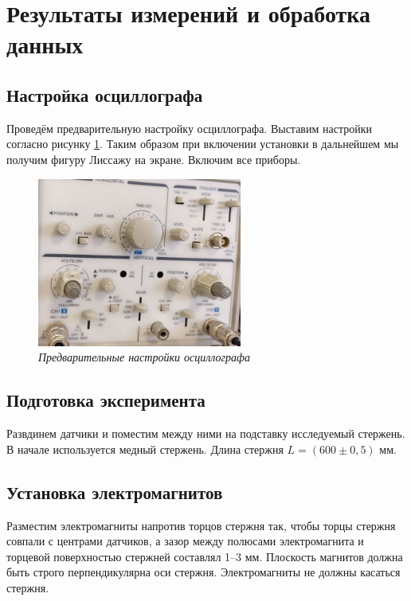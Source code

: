 \documentclass[a4paper,12pt]{article}
\begin{document}
\section{Результаты измерений и обработка данных}

\subsection{Настройка осциллографа}

Проведём предварительную настройку осциллографа. Выставим настройки согласно рисунку \ref{oscillator}. Таким образом при включении установки в дальнейшем мы получим фигуру Лиссажу на экране. Включим все приборы.

\begin{figure}[h!]
        \centering
	\includegraphics[width=0.6\textwidth]{oscillator-settings.jpg}
	\caption{\textit{Предварительные настройки осциллографа}}
	\label{oscillator}
\end{figure}

\subsection{Подготовка эксперимента}
\label{expirement-two}

Развдинем датчики и поместим между ними на подставку исследуемый стержень. В начале используется медный стержень. Длина стержня $L = (600 \pm 0,5) \text{ мм}$.

\subsection{Установка электромагнитов}

Разместим электромагниты напротив торцов стержня так, чтобы торцы стержня совпали с центрами датчиков, а зазор между полюсами электромагнита и торцевой поверхностью стержней составлял 1–3 мм. Плоскость магнитов должна быть строго перпендикулярна оси стержня. Электромагниты не должны касаться стержня.
\end{document}
